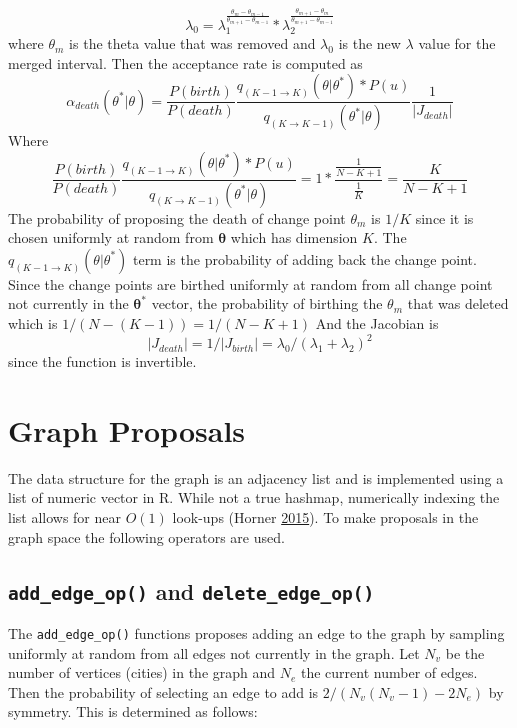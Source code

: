 \documentclass[11pt,a4paper]{article}
\numberwithin{equation}{section}
\begin{document}
\[ \lambda_0 =\lambda_1^{\frac{\theta_m-\theta_{m-1}}{\theta_{m+1}-\theta_{m-1}}}*\lambda_2^{\frac{\theta_{m+1}-\theta_{m}}{\theta_{m+1}-\theta_{m-1}}} \]
where \(\theta_m\) is the theta value that was removed and \(\lambda_0\)
is the new \(\lambda\) value for the merged interval. Then the
acceptance rate is computed as
\[\alpha_{death}(\theta^*|\theta) = \frac{P(birth)}{P(death)}\frac{q_{(K-1\rightarrow K)}(\theta|\theta^*)*P(u)}{q_{(K\rightarrow K - 1)}(\theta^*|\theta)}\frac{1}{|J_{death}|}\]
Where
\[ \frac{P(birth)}{P(death)}\frac{q_{(K-1\rightarrow K)}(\theta|\theta^*)*P(u)}{q_{(K\rightarrow K - 1)}(\theta^*|\theta)} = 1*\frac{\frac{1}{N-K+1}}{\frac{1}{K}} = \frac{K}{N-K+1} \]
The probability of proposing the death of change point \(\theta_m\) is
\(1/K\) since it is chosen uniformly at random from
\(\boldsymbol{\theta}\) which has dimension \(K\). The
\(q_{(K-1\rightarrow K)}(\theta|\theta^*)\) term is the probability of
adding back the change point. Since the change points are birthed
uniformly at random from all change point not currently in the
\(\boldsymbol{\theta^*}\) vector, the probability of birthing the
\(\theta_m\) that was deleted which is \(1/(N-(K-1)) = 1/(N-K+1)\) And
the Jacobian is
\[|J_{death}| = 1/|J_{birth}| = \lambda_0/(\lambda_1 + \lambda_2)^2\]
since the function is invertible.

\hypertarget{graph-proposals}{%
\section{Graph Proposals}\label{graph-proposals}}

The data structure for the graph is an adjacency list and is implemented
using a list of numeric vector in R. While not a true hashmap,
numerically indexing the list allows for near \(O(1)\) look-ups (Horner
\protect\hyperlink{ref-horner_hash_2015}{2015}). To make proposals in
the graph space the following operators are used.

\hypertarget{add_edge_op-and-delete_edge_op}{%
\subsection{\texorpdfstring{\texttt{add\_edge\_op()} and
\texttt{delete\_edge\_op()}}{add\_edge\_op() and delete\_edge\_op()}}\label{add_edge_op-and-delete_edge_op}}

The \texttt{add\_edge\_op()} functions proposes adding an edge to the
graph by sampling uniformly at random from all edges not currently in
the graph. Let \(N_v\) be the number of vertices (cities) in the graph
and \(N_e\) the current number of edges. Then the probability of
selecting an edge to add is \(2/(N_v(N_v-1) - 2N_e)\) by symmetry. This
is determined as follows:
\end{document}
